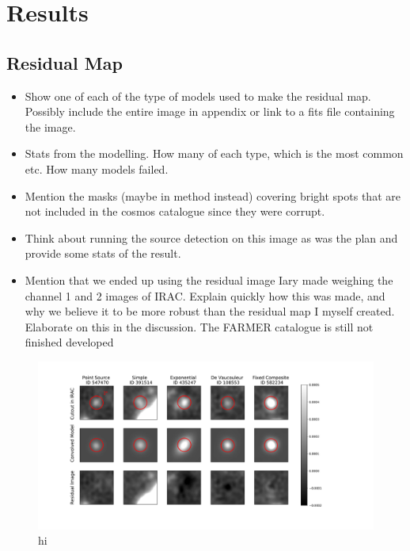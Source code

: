\section{Results}
\subsection{Residual Map}
\begin{itemize}
    \item Show one of each of the type of models used to make the residual map. Possibly include the entire image in appendix or link to a fits file containing the image.
    \item Stats from the modelling. How many of each type, which is the most common etc. How many models failed.
    \item Mention the masks (maybe in method instead) covering bright spots that are not included in the cosmos catalogue since they were corrupt.
    \item Think about running the source detection on this image as was the plan and provide some stats of the result.
    \item Mention that we ended up using the residual image Iary made weighing the channel 1 and 2 images of IRAC. Explain quickly how this was made, and why we believe it to be more robust than the residual map I myself created. Elaborate on this in the discussion. The FARMER catalogue is still not finished developed
\end{itemize}

\begin{figure}[h!]
    \centering
    \includegraphics[trim={3cm 2.5cm 5cm 1.5cm},clip,scale=0.5]{Code/Saved_Figures/Model_cutouts.pdf}
    \caption{hi}
    \label{Model_cutouts}
\end{figure}

